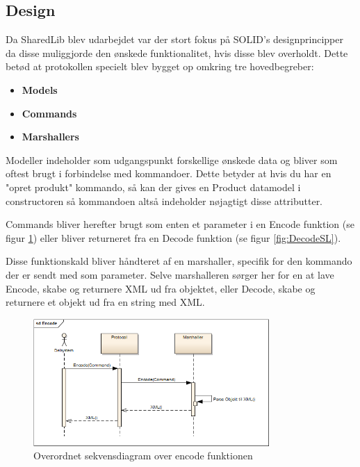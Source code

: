\subsection{Design}
Da SharedLib blev udarbejdet var der stort fokus på SOLID's designprincipper da disse muliggjorde den ønskede funktionalitet, hvis disse blev overholdt. Dette betød at protokollen specielt blev bygget op omkring tre hovedbegreber:

\begin{itemize}
	\item \textbf{Models}
	\item \textbf{Commands} 
	\item \textbf{Marshallers}
\end{itemize}





Modeller indeholder som udgangspunkt forskellige ønskede data og bliver som oftest brugt i forbindelse med kommandoer. Dette betyder at hvis du har en "opret produkt" kommando, så kan der gives en Product datamodel i constructoren så kommandoen altså indeholder nøjagtigt disse attributter. 

Commands bliver herefter brugt som enten et parameter i en Encode funktion (se figur \ref{fig:EncodeSL}) eller bliver returneret fra en Decode funktion (se figur \ref{fig:DecodeSL}). 

Disse funktionskald bliver håndteret af en marshaller, specifik for den kommando der er sendt med som parameter. Selve marshalleren sørger her for en at lave Encode, skabe og returnere XML ud fra objektet, eller Decode, skabe og returnere et objekt ud fra en string med XML.

\begin{figure}[H]
	\centering
	\includegraphics[width=0.8\textwidth]{Projektbeskrivelse/DesignOgImplementering/SharedLib/Images/Rapport/Encode.png}
	\caption{Overordnet sekvensdiagram over encode funktionen}
	\label{fig:EncodeSL}
\end{figure}

